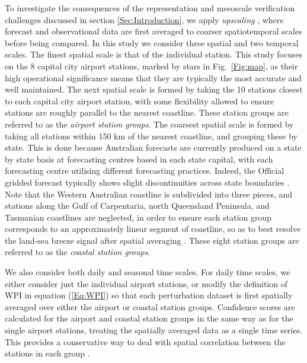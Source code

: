\documentclass{ametsoc}
\begin{document}
To investigate the consequences of the representation and mesoscale verification challenges discussed in section \ref{Sec:Introduction}, we apply \textit{upscaling} \citep{ebert08}, where forecast and observational data are first averaged to coarser spatiotemporal scales before being compared. In this study we consider three spatial and two temporal scales. The finest spatial scale is that of the individual station. This study focuses on the 8 capital city airport stations, marked by stars in Fig.~\ref{Fig:map}, as their high operational significance means that they are typically the most accurate and well maintained. The next spatial scale is formed by taking the 10 stations closest to each capital city airport station, with some flexibility allowed to ensure stations are roughly parallel to the nearest coastline. These station groups are referred to as the \textit{airport station groups}. The coarsest spatial scale is formed by taking all stations within 150 km of the nearest coastline, and grouping these by state. This is done because Australian forecasts are currently produced on a state by state basis at forecasting centres based in each state capital, with each forecasting centre utilising different forecasting practices. Indeed, the Official gridded forecast typically shows slight discontinuities across state boundaries \citep{bomMetEye19}. Note that the Western Australian coastline is subdivided into three pieces, and stations along the Gulf of Carpentaria, north Queensland Peninsula, and Tasmanian coastlines are neglected, in order to ensure each station group corresponds to an approximately linear segment of coastline, so as to best resolve the land-sea breeze signal after spatial averaging \citep[e.g.][]{vincent16}. These eight station groups are referred to as the \textit{coastal station groups}.

We also consider both daily and seasonal time scales. For daily time scales, we either consider just the individual airport stations, or modify the definition of WPI in equation (\ref{Eq:WPI}) so that each perturbation dataset is first spatially averaged over either the airport or coastal station groups. Confidence scores are calculated for the airport and coastal station groups in the same way as for the single airport stations, treating the spatially averaged data as a single time series. This provides a conservative way to deal with spatial correlation between the stations in each group \citep{griffiths17}. 
\end{document}
